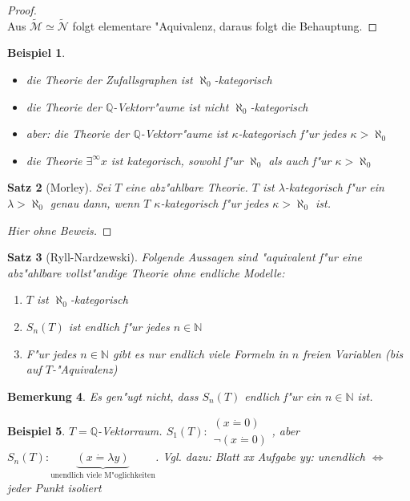 \documentclass[a4paper,12pt,numbers=noenddot,parskip=full]{scrartcl}
\newcommand{\setN}{\mathbb{N}}
\newcommand{\setQ}{\mathbb{Q}}
\newcommand{\scrM}{\mathcal{M}}
\newcommand{\scrN}{\mathcal{N}}
\theoremstyle{dotless}
\newtheorem{theorem}{Satz}[section]
\newtheorem{example}[theorem]{Beispiel}
\newtheorem{remark}[theorem]{Bemerkung}
\begin{document}
\begin{proof}
\begin{tikzpicture}[x=0.75pt,y=0.75pt,yscale=-1,xscale=1]
	
	\end{tikzpicture}\\
	Aus $\tilde{\scrM} \simeq \tilde{\scrN}$ folgt elementare "Aquivalenz, daraus folgt die Behauptung.
\end{proof}
\begin{example}
	\begin{itemize}
		\item die Theorie der Zufallsgraphen ist $\aleph_0$-kategorisch
		\item die Theorie der $\setQ$-Vektorr"aume ist nicht $\aleph_0$-kategorisch
		\item aber: die Theorie der $\setQ$-Vektorr"aume ist $\kappa$-kategorisch f"ur jedes $\kappa > \aleph_0$
		\item die Theorie $\exists^\infty x$ ist kategorisch, sowohl f"ur $\aleph_0$ als auch f"ur $\kappa>\aleph_0$
	\end{itemize}
\end{example}
\begin{theorem}[Morley]
	Sei $T$ eine abz"ahlbare Theorie. $T$ ist $\lambda$-kategorisch f"ur ein $\lambda > \aleph_0$ genau dann, wenn $T$ $\kappa$-kategorisch f"ur jedes $\kappa>\aleph_0$ ist.
\end{theorem}
\begin{proof}[Hier ohne Beweis]
\end{proof}
\begin{theorem}[Ryll-Nardzewski]\label{rn}
	Folgende Aussagen sind "aquivalent f"ur eine abz"ahlbare vollst"andige Theorie ohne endliche Modelle:
	\begin{enumerate}[label=(\alph*)]
		\item $T$ ist $\aleph_0$-kategorisch
		\item $S_n (T)$ ist endlich f"ur jedes $n \in \setN$
		\item F"ur jedes $n \in \setN$ gibt es nur endlich viele Formeln in $n$ freien Variablen (bis auf $T$-"Aquivalenz)
	\end{enumerate}
\end{theorem}
\begin{remark}
	Es gen"ugt nicht, dass $S_n (T)$ endlich f"ur \emph{ein} $n \in \setN$ ist.
\end{remark}
\begin{example}
	$T = \setQ$-Vektorraum. $S_1 (T): \begin{array}{r}
		(x \dot=0)\\
		\lnot(x \dot= 0)
	\end{array}$, aber $S_n (T): \underbrace{(x \dot= \lambda y)}_{\text{unendlich viele M"oglichkeiten}}$. Vgl. dazu: %
	Blatt xx Aufgabe yy: unendlich $\Leftrightarrow$ jeder Punkt isoliert
\end{example}
\end{document}
